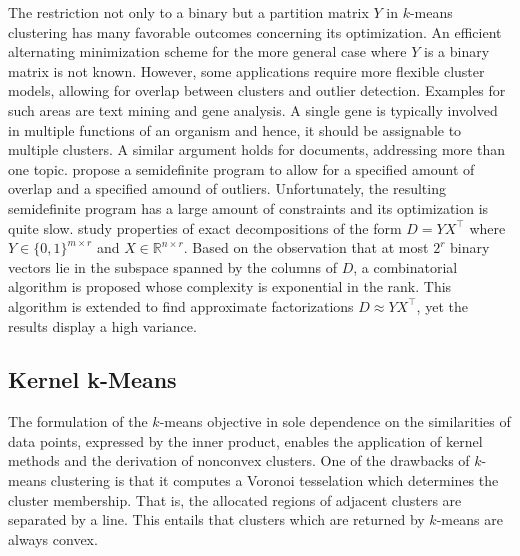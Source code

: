 The restriction not only to a binary but a partition matrix $Y$ in $k$-means clustering has many favorable outcomes concerning its optimization. An efficient alternating minimization scheme for the more general case where $Y$ is a binary matrix is not known.   However, some applications require more flexible cluster models, allowing for overlap between clusters and outlier detection. Examples for such areas are text mining and gene analysis. A single gene is typically involved in multiple functions of an organism and hence, it should be assignable to multiple clusters. A similar argument holds for documents, addressing more than one topic. \cite{whang2018non} propose a semidefinite program to allow for a specified amount of overlap and a specified amound of outliers. Unfortunately, the resulting semidefinite program has a large amount of constraints and its optimization is quite slow.
\cite{slawski2013matrix} study properties of exact decompositions of the form $D= YX^\top$ where $Y\in\{0,1\}^{m\times r}$ and $X\in\mathbb{R}^{n\times r}$. Based on the observation that at most $2^r$ binary vectors lie in the subspace spanned by the columns of $D$, a combinatorial algorithm is proposed whose complexity is exponential in the rank. This algorithm is extended to find approximate factorizations $D\approx YX^\top$, yet the results display a high variance. 
\subsection{Kernel k-Means}\label{sec:ZS:kkmeans}
The formulation of the $k$-means objective in sole dependence on the similarities of data points, expressed by the inner product, enables the application of kernel methods and the derivation of nonconvex clusters. One of the drawbacks of $k$-means clustering is that it computes a Voronoi tesselation which determines the cluster membership. That is, the allocated regions of adjacent clusters are separated by a line. This entails that clusters which are returned by $k$-means are always convex. 


